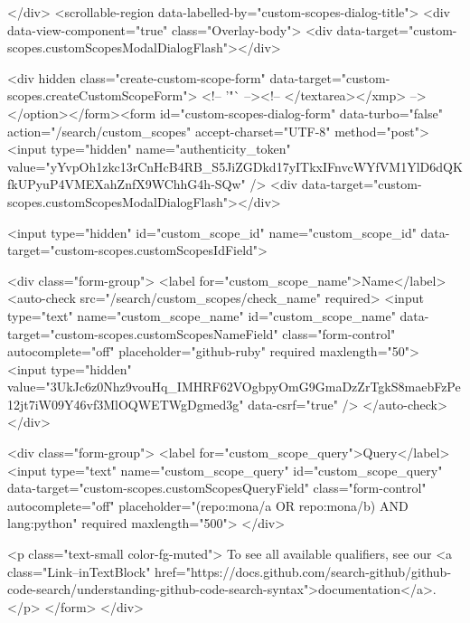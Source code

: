 {{</div>
      <scrollable-region data-labelled-by="custom-scopes-dialog-title">
        <div data-view-component="true" class="Overlay-body">        <div data-target="custom-scopes.customScopesModalDialogFlash"></div>

        <div hidden class="create-custom-scope-form" data-target="custom-scopes.createCustomScopeForm">
        <!-- '"` --><!-- </textarea></xmp> --></option></form><form id="custom-scopes-dialog-form" data-turbo="false" action="/search/custom_scopes" accept-charset="UTF-8" method="post"><input type="hidden" name="authenticity_token" value="yYvpOh1zkc13rCnHcB4RB_S5JiZGDkd17yITkxIFnvcWYfVM1YlD6dQKfkUPyuP4VMEXahZnfX9WChhG4h-SQw" />
          <div data-target="custom-scopes.customScopesModalDialogFlash"></div>

          <input type="hidden" id="custom_scope_id" name="custom_scope_id" data-target="custom-scopes.customScopesIdField">

          <div class="form-group">
            <label for="custom_scope_name">Name</label>
            <auto-check src="/search/custom_scopes/check_name" required>
              <input
                type="text"
                name="custom_scope_name"
                id="custom_scope_name"
                data-target="custom-scopes.customScopesNameField"
                class="form-control"
                autocomplete="off"
                placeholder="github-ruby"
                required
                maxlength="50">
              <input type="hidden" value="3UkJc6z0Nhz9vouHq_IMHRF62VOgbpyOmG9GmaDzZrTgkS8maebFzPe12jt7iW09Y46vf3MlOQWETWgDgmed3g" data-csrf="true" />
            </auto-check>
          </div>

          <div class="form-group">
            <label for="custom_scope_query">Query</label>
            <input
              type="text"
              name="custom_scope_query"
              id="custom_scope_query"
              data-target="custom-scopes.customScopesQueryField"
              class="form-control"
              autocomplete="off"
              placeholder="(repo:mona/a OR repo:mona/b) AND lang:python"
              required
              maxlength="500">
          </div>

          <p class="text-small color-fg-muted">
            To see all available qualifiers, see our <a class="Link--inTextBlock" href="https://docs.github.com/search-github/github-code-search/understanding-github-code-search-syntax">documentation</a>.
          </p>
</form>        </div>

}}
